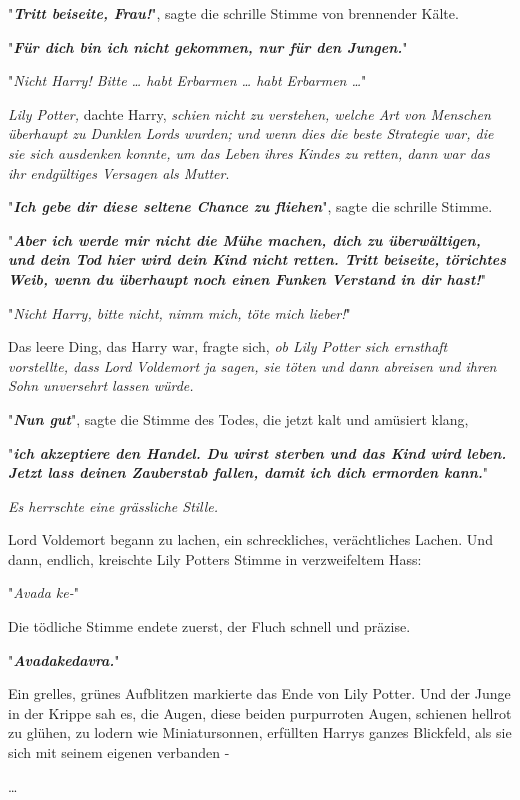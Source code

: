 {"\textbf{\emph{Tritt beiseite, Frau!}}", sagte die schrille Stimme von brennender Kälte.

"\textbf{\emph{Für dich bin ich nicht gekommen, nur für den Jungen.}}"

"\emph{Nicht Harry! Bitte … habt Erbarmen … habt Erbarmen …}"

\emph{Lily Potter,} dachte Harry, \emph{schien nicht zu verstehen, welche Art von Menschen überhaupt zu Dunklen Lords wurden; und wenn dies die beste Strategie war, die sie sich ausdenken konnte, um das Leben ihres Kindes zu retten, dann war das ihr endgültiges Versagen als Mutter}.

"\textbf{\emph{Ich gebe dir diese seltene Chance zu fliehen}}", sagte die schrille Stimme.

"\textbf{\emph{Aber ich werde mir nicht die Mühe machen, dich zu überwältigen, und dein Tod hier wird dein Kind nicht retten. Tritt beiseite, törichtes Weib, wenn du überhaupt noch einen Funken Verstand in dir hast!}}"

"\emph{Nicht Harry, bitte nicht, nimm mich, töte mich lieber!}"

Das leere Ding, das Harry war, fragte sich, \emph{ob Lily Potter sich ernsthaft vorstellte, dass Lord Voldemort ja sagen, sie töten und dann abreisen und ihren Sohn unversehrt lassen würde.}

"\textbf{\emph{Nun gut}}", sagte die Stimme des Todes, die jetzt kalt und amüsiert klang,

"\textbf{\emph{ich akzeptiere den Handel. Du wirst sterben und das Kind wird leben. Jetzt lass deinen Zauberstab fallen, damit ich dich ermorden kann.}}"

\emph{Es herrschte eine grässliche Stille.}

Lord Voldemort begann zu lachen, ein schreckliches, verächtliches Lachen. Und dann, endlich, kreischte Lily Potters Stimme in verzweifeltem Hass:

"\emph{Avada ke-}"

Die tödliche Stimme endete zuerst, der Fluch schnell und präzise.

"\textbf{\emph{Avadakedavra.}}"

Ein grelles, grünes Aufblitzen markierte das Ende von Lily Potter. Und der Junge in der Krippe sah es, die Augen, diese beiden purpurroten Augen, schienen hellrot zu glühen, zu lodern wie Miniatursonnen, erfüllten Harrys ganzes Blickfeld, als sie sich mit seinem eigenen verbanden -

…

}
